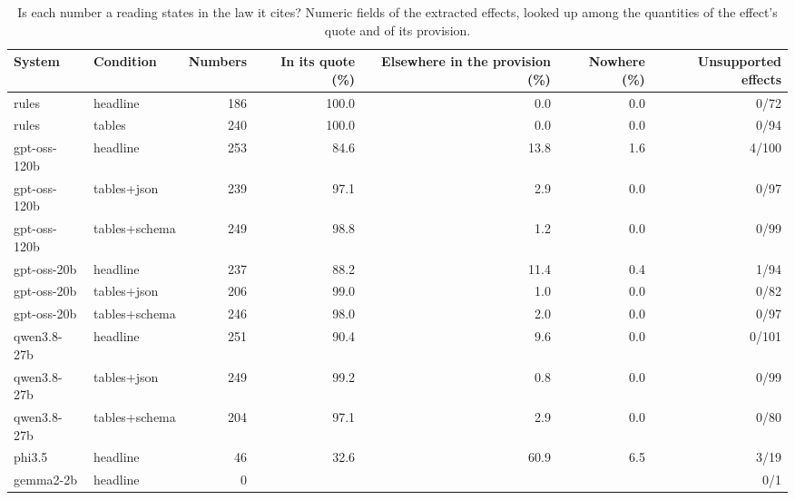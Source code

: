 \begin{table}[t]
\centering\small
\caption{Is each number a reading states in the law it cites? Numeric fields of the extracted effects, looked up among the quantities of the effect's quote and of its provision.}
\label{tab:number_grounding}
\begin{tabular}{llrrrrr}
\toprule
System & Condition & Numbers & In its quote (\%) & Elsewhere in the provision (\%) & Nowhere (\%) & Unsupported effects \\
\midrule
rules & headline & 186 & 100.0 & 0.0 & 0.0 & 0/72 \\
rules & tables & 240 & 100.0 & 0.0 & 0.0 & 0/94 \\
gpt-oss-120b & headline & 253 & 84.6 & 13.8 & 1.6 & 4/100 \\
gpt-oss-120b & tables+json & 239 & 97.1 & 2.9 & 0.0 & 0/97 \\
gpt-oss-120b & tables+schema & 249 & 98.8 & 1.2 & 0.0 & 0/99 \\
gpt-oss-20b & headline & 237 & 88.2 & 11.4 & 0.4 & 1/94 \\
gpt-oss-20b & tables+json & 206 & 99.0 & 1.0 & 0.0 & 0/82 \\
gpt-oss-20b & tables+schema & 246 & 98.0 & 2.0 & 0.0 & 0/97 \\
qwen3.8-27b & headline & 251 & 90.4 & 9.6 & 0.0 & 0/101 \\
qwen3.8-27b & tables+json & 249 & 99.2 & 0.8 & 0.0 & 0/99 \\
qwen3.8-27b & tables+schema & 204 & 97.1 & 2.9 & 0.0 & 0/80 \\
phi3.5 & headline & 46 & 32.6 & 60.9 & 6.5 & 3/19 \\
gemma2-2b & headline & 0 &  &  &  & 0/1 \\
\bottomrule
\end{tabular}
\end{table}
